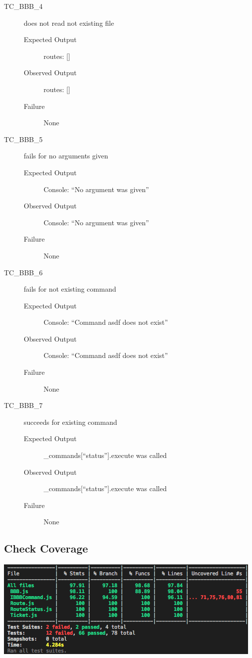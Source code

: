 \documentclass[11pt]{article}
\begin{document}
\begin{description}
\item[{TC\_BBB\_4}] does not read not existing file
\begin{description}
\item[{Expected Output}] routes: []
\item[{Observed Output}] routes: []
\item[{Failure}] None
\end{description}

\item[{TC\_BBB\_5}] fails for no arguments given
\begin{description}
\item[{Expected Output}] Console: “No argument was given”
\item[{Observed Output}] Console: “No argument was given”
\item[{Failure}] None
\end{description}

\item[{TC\_BBB\_6}] fails for not existing command
\begin{description}
\item[{Expected Output}] Console: “Command asdf does not exist”
\item[{Observed Output}] Console: “Command asdf does not exist”
\item[{Failure}] None
\end{description}

\item[{TC\_BBB\_7}] succeeds for existing command
\begin{description}
\item[{Expected Output}] \_commands[“status”].execute was called
\item[{Observed Output}] \_commands[“status”].execute was called
\item[{Failure}] None
\end{description}
\end{description}

\subsection{Check Coverage}
\label{sec:org74b024c}

\begin{center}
\includegraphics[width=.9\linewidth]{documentation.org.img/Iteration2_Coverage2.png}
\end{center}
\end{document}

